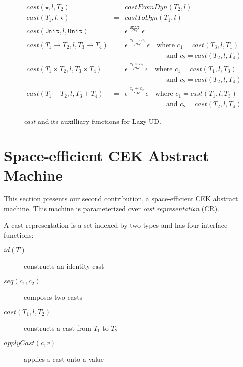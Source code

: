 \documentclass[acmsmall,review,anonymous]{acmart}\settopmatter{printfolios=true,printccs=false,printacmref=false}
\newcommand{\funrule}[3]{#1 &=& #2 & #3\\}
\newcommand{\POOunit}[0]{\mathtt{Unit}}
\newcommand{\hyperCoercionC}[3]{#1 \overset{#2}{\curvearrowright} #3}
\begin{document}
\begin{figure}
  
  \[
  \begin{array}{rclr}
    \funrule{cast(\star,l,T_2)}{ castFromDyn(T_2, l) }{} 
    \funrule{cast(T_1,l,\star)}{ castToDyn(T_1, l) }{} 
    \funrule{cast(\POOunit,l,\POOunit)}{
        \hyperCoercionC{\epsilon}{\POOunit}{\epsilon} }{} 
    cast(T_1 \to T_2,l, T_3 \to T_4) &=&
      \hyperCoercionC{\epsilon}{
         c_1
        \to
         c_2
      }{\epsilon}
      \quad \text{where } c_1 = cast(T_3, l, T_1) \\
      &&  \qquad\qquad\qquad \text{and } c_2 = cast(T_2, l, T_4)\\
    cast(T_1 \times T_2,l, T_3 \times T_4) &=&
      \hyperCoercionC{\epsilon}{
         c_1
        \times
         c_2
      }{\epsilon}
      \quad \text{where } c_1 = cast(T_1, l, T_3) \\
      &&  \qquad\qquad\qquad \text{and } c_2 = cast(T_2, l, T_4)\\
    cast(T_1 + T_2,l, T_3 + T_4) &=&
      \hyperCoercionC{\epsilon}{
         c_1
        +
         c_2
      }{\epsilon}
      \quad \text{where } c_1 = cast(T_1, l, T_3) \\
      &&  \qquad\qquad\qquad \text{and } c_2 = cast(T_2, l, T_4)
  \end{array}
  \]

  \caption{\textit{cast} and its auxilliary functions for Lazy UD.}
  \label{fig:HC-UD-cast}
\end{figure}


\section{Space-efficient CEK Abstract Machine}
\label{sec:CEKS}

This section presents our second contribution, a space-efficient CEK abstract 
machine. This machine is parameterized over \emph{cast representation} (CR). 

\begin{definition}
	A cast representation is a set indexed by two types and has four interface 
	functions:
	\begin{description}
		\item[$ id(T) $] constructs an identity cast
		\item[$ seq(c_1,c_2) $] composes two casts
		\item[$ cast(T_1,l,T_2) $] constructs a cast from $ T_1 $ to $ T_2 $
		\item[$ applyCast(c,v) $] applies a cast onto a value
	\end{description}
\end{definition}
\end{document}
